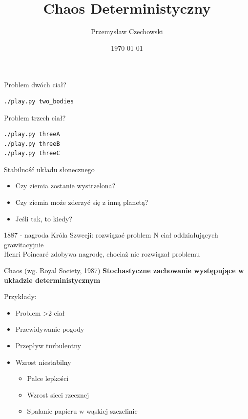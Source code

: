 \documentclass{beamer}
\begin{document}
\title{Chaos Deterministyczny} 
\author{Przemysław Czechowski} 
\date{\today} 

\frame{\titlepage} 

\begin{frame}[fragile]
Problem dwóch ciał?\pause
\begin{lstlisting}
./play.py two_bodies
\end{lstlisting}
\end{frame}

\begin{frame}[fragile]
Problem trzech ciał?\pause
\begin{lstlisting}
./play.py threeA
./play.py threeB
./play.py threeC
\end{lstlisting}
\end{frame}

\begin{frame}{Stabilność układu słonecznego}\pause
\begin{itemize}
\item Czy ziemia zostanie wystrzelona?\pause
\item Czy ziemia może zderzyć się z inną planetą?\pause
\item Jeśli tak, to kiedy?\pause
\end{itemize} 

1887 - nagroda Króla Szwecji: rozwiązać problem N ciał oddziałujących grawitacyjnie\pause\\
Henri Poincaré zdobywa nagrodę, chociaż nie rozwiązał problemu
\end{frame}

\begin{frame}{Chaos (wg. Royal Society, 1987)}
\pause
\textbf{ Stochastyczne zachowanie występujące w układzie deterministycznym}\pause

Przykłady:\pause
\begin{itemize}[<+->]
\item Problem >2 ciał
\item Przewidywanie pogody
\item Przepływ turbulentny
\item Wzrost niestabilny
	\begin{itemize}[<+->]
		\item Palce lepkości
		\item Wzrost sieci rzecznej
		\item Spalanie papieru w wąskiej szczelinie
	\end{itemize} 
\end{itemize} 
\end{frame}
\end{document}

